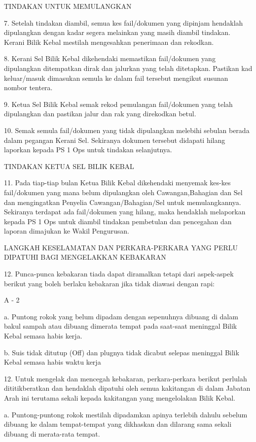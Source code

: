 \documentclass[
]{article}
\begin{document}
{TINDAKAN UNTUK MEMULANGKAN}

7. Setelah tindakan diambil, semua kes fail/dokumen yang dipinjam
hendaklah dipulangkan dengan kadar segera melainkan yang masih diambil
tindakan. Kerani Bilik Kebal mestilah mengesahkan penerimaan dan
rekodkan.

8. Kerani Sel Bilik Kebal dikehendaki memastikan fail/dokumen yang
dipulangkan ditempatkan dirak dan jalurkan yang telah ditetapkan.
Pastikan kad keluar/masuk dimasukan semula ke dalam fail tersebut
mengikut susunan nombor tentera.

9. Ketua Sel Bilik Kebal semak rekod pemulangan fail/dokumen yang telah
dipulangkan dan pastikan jalur dan rak yang direkodkan betul.

10. Semak semula fail/dokumen yang tidak dipulangkan melebihi sebulan
berada dalam pegangan Kerani Sel. Sekiranya dokumen tersebut didapati
hilang laporkan kepada PS 1 Ops untuk tindakan selanjutnya.

{TINDAKAN KETUA SEL BILIK KEBAL}

11. Pada tiap-tiap bulan Ketua Bilik Kebal dikehendaki menyemak kes-kes
fail/dokumen yang mana belum dipulangkan oleh Cawangan,Bahagian dan Sel
dan mengingatkan Penyelia Cawangan/Bahagian/Sel untuk memulangkannya.
Sekiranya terdapat ada fail/dokumen yang hilang, maka hendaklah
melaporkan kepada PS 1 Ops untuk diambil tindakan pembetulan dan
pencegahan dan laporan dimajukan ke Wakil Pengurusan.

{LANGKAH KESELAMATAN DAN PERKARA-PERKARA YANG PERLU DIPATUHI BAGI
MENGELAKKAN KEBAKARAN}

12. Punca-punca kebakaran tiada dapat diramalkan tetapi dari aspek-aspek
berikut yang boleh berlaku kebakaran jika tidak diawasi dengan rapi:

A - 2

a. Puntong rokok yang belum dipadam dengan sepenuhnya dibuang di dalam
bakul sampah atau dibuang dimerata tempat pada saat-saat meninggal Bilik
Kebal semasa habis kerja.

b. Suis tidak ditutup (Off) dan plugnya tidak dicabut selepas meninggal
Bilik Kebal semasa habis waktu kerja

12. Untuk mengelak dan mencegah kebakaran, perkara-perkara berikut
perlulah dititikberatkan dan hendaklah dipatuhi oleh semua kakitangan di
dalam Jabatan Arah ini terutama sekali kepada kakitangan yang
mengelolakan Bilik Kebal.

a. Puntong-puntong rokok mestilah dipadamkan apinya terlebih dahulu
sebelum dibuang ke dalam tempat-tempat yang dikhaskan dan dilarang sama
sekali dibuang di merata-rata tempat.
\end{document}
